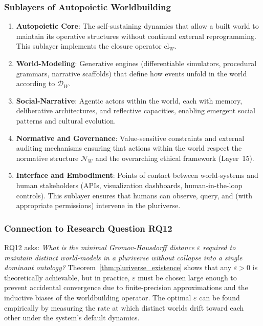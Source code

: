 \subsubsection{Sublayers of Autopoietic Worldbuilding}
\begin{enumerate}
    \item \textbf{Autopoietic Core}: The self-sustaining dynamics that allow a built world to maintain its operative structures without continual external reprogramming. This sublayer implements the closure operator $\text{cl}_W$.
    \item \textbf{World-Modeling}: Generative engines (differentiable simulators, procedural grammars, narrative scaffolds) that define how events unfold in the world according to $\mathcal{D}_W$.
    \item \textbf{Social-Narrative}: Agentic actors within the world, each with memory, deliberative architectures, and reflective capacities, enabling emergent social patterns and cultural evolution.
    \item \textbf{Normative and Governance}: Value-sensitive constraints and external auditing mechanisms ensuring that actions within the world respect the normative structure $\mathcal{N}_W$ and the overarching ethical framework (Layer~15).
    \item \textbf{Interface and Embodiment}: Points of contact between world-systems and human stakeholders (APIs, visualization dashboards, human-in-the-loop controls). This sublayer ensures that humans can observe, query, and (with appropriate permissions) intervene in the pluriverse.
\end{enumerate}

\subsubsection{Connection to Research Question RQ12}
RQ12 asks: \emph{What is the minimal Gromov-Hausdorff distance $\varepsilon$ required to maintain distinct world-models in a pluriverse without collapse into a single dominant ontology?} Theorem~\ref{thm:pluriverse_existence} shows that any $\varepsilon > 0$ is theoretically achievable, but in practice, $\varepsilon$ must be chosen large enough to prevent accidental convergence due to finite-precision approximations and the inductive biases of the worldbuilding operator. The optimal $\varepsilon$ can be found empirically by measuring the rate at which distinct worlds drift toward each other under the system's default dynamics.

